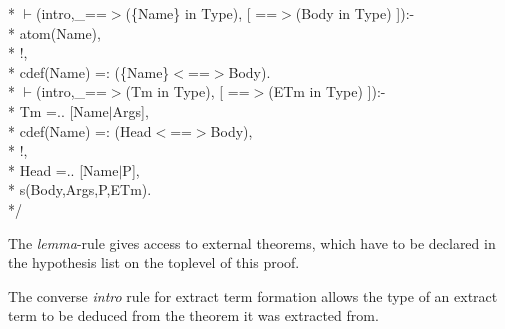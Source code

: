 \documentclass[11pt]{report}
\begin{document}
\begin{enumerate}
\begin{sf}
\begin{tabbing}
\hspace{0em}* $\vdash$(intro,\_\hspace{0.1em}==$>$(\{Name\} in Type), [ ==$>$(Body in Type) ]):-\\[-0.15ex]
\hspace{0em}*     atom(Name),\\[-0.15ex]
\hspace{0em}*     !,\\[-0.15ex]
\hspace{0em}*     cdef(Name) =: (\{Name\}$<$==$>$Body).\\[-0.15ex]
\hspace{0em}* $\vdash$(intro,\_\hspace{0.1em}==$>$(Tm in Type), [ ==$>$(ETm in Type) ]):-\\[-0.15ex]
\hspace{0em}*     Tm =.. [Name$\mid$Args],\\[-0.15ex]
\hspace{0em}*     cdef(Name) =: (Head$<$==$>$Body),\\[-0.15ex]
\hspace{0em}*     !,\\[-0.15ex]
\hspace{0em}*     Head =.. [Name$\mid$P],\\[-0.15ex]
\hspace{0em}*     s(Body,Args,P,ETm).\\[-0.15ex]
\hspace{0em}*/\\[-0.7ex]

\end{tabbing}\end{sf}

 The \emph{lemma}-rule gives access to external theorems,
 which have to be declared in the hypothesis list on the
 toplevel of this proof. 
 
 The converse \emph{intro} rule for extract term formation
 allows the type of an extract term to be deduced from the
 theorem it was extracted from.
 \end{enumerate} 
\end{document}
